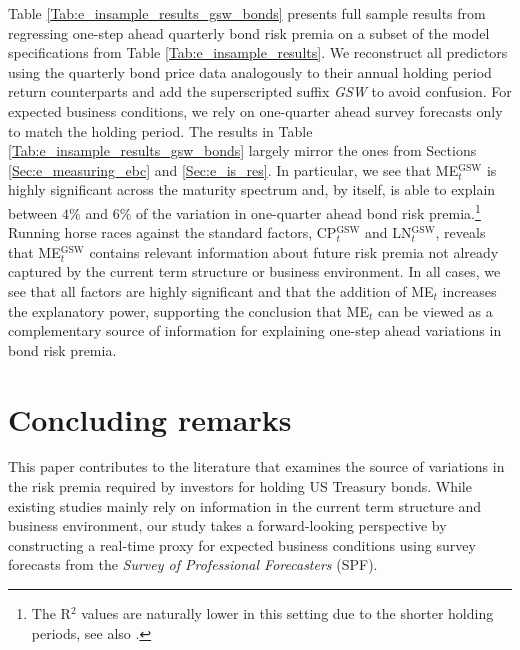 \documentclass[12pt,letterpaper,leqno,doublespacing]{article}
\begin{document}
Table \ref{Tab:e_insample_results_gsw_bonds} presents full sample results from regressing one-step ahead quarterly bond risk premia on a subset of the model specifications from Table \ref{Tab:e_insample_results}. We reconstruct all predictors using the quarterly bond price data analogously to their annual holding period return counterparts and add the superscripted suffix \emph{GSW} to avoid confusion. For expected business conditions, we rely on one-quarter ahead survey forecasts only to match the holding period. The results in Table \ref{Tab:e_insample_results_gsw_bonds} largely mirror the ones from Sections \ref{Sec:e_measuring_ebc} and \ref{Sec:e_is_res}. In particular, we see that ME$_{t}^{\text{GSW}}$ is highly significant across the maturity spectrum and, by itself, is able to explain between $4\%$ and $6\%$ of the variation in one-quarter ahead bond risk premia.\footnote{The R$^{2}$ values are naturally lower in this setting due to the shorter holding periods, see also \cite{GarganoPettenuzzoTimmermann2014}.} Running horse races against the standard factors, CP$_{t}^{\text{GSW}}$ and LN$_{t}^{\text{GSW}}$, reveals that ME$_{t}^{\text{GSW}}$ contains relevant information about future risk premia not already captured by the current term structure or business environment. In all cases, we see that all factors are highly significant and that the addition of ME$_{t}$ increases the explanatory power, supporting the conclusion that ME$_{t}$ can be viewed as a complementary source of information for explaining one-step ahead variations in bond risk premia. 


\section{Concluding remarks}\label{Sec:e_conclusion}
This paper contributes to the literature that examines the source of variations in the risk premia required by investors for holding US Treasury bonds. While existing studies mainly rely on information in the current term structure and business environment, our study takes a forward-looking perspective by constructing a real-time proxy for expected business conditions using survey forecasts from the \emph{Survey of Professional Forecasters} (SPF).
\end{document}
